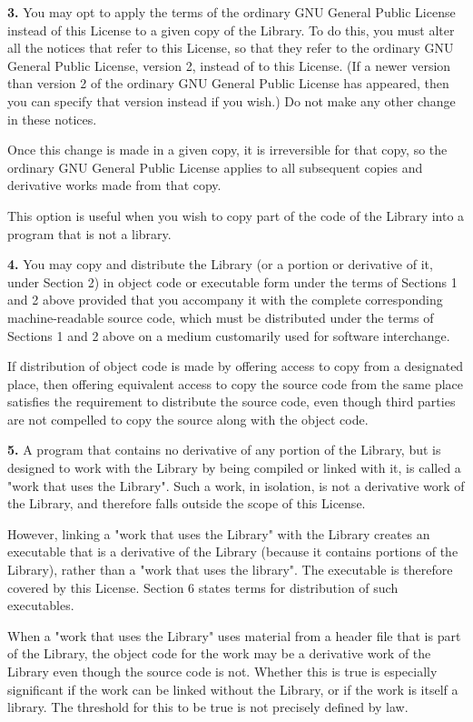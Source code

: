{\bf 3.} You may opt to apply the terms of the ordinary GNU General Public
License instead of this License to a given copy of the Library. To do this,
you must alter all the notices that refer to this License, so that they refer
to the ordinary GNU General Public License, version 2, instead of to this
License. (If a newer version than version 2 of the ordinary GNU General Public
License has appeared, then you can specify that version instead if you wish.)
Do not make any other change in these notices. 

Once this change is made in a given copy, it is irreversible for that copy, so
the ordinary GNU General Public License applies to all subsequent copies and
derivative works made from that copy. 

This option is useful when you wish to copy part of the code of the Library
into a program that is not a library. 

{\bf 4.} You may copy and distribute the Library (or a portion or derivative
of it, under Section 2) in object code or executable form under the terms of
Sections 1 and 2 above provided that you accompany it with the complete
corresponding machine-readable source code, which must be distributed under
the terms of Sections 1 and 2 above on a medium customarily used for software
interchange. 

If distribution of object code is made by offering access to copy from a
designated place, then offering equivalent access to copy the source code from
the same place satisfies the requirement to distribute the source code, even
though third parties are not compelled to copy the source along with the
object code. 

{\bf 5.} A program that contains no derivative of any portion of the Library,
but is designed to work with the Library by being compiled or linked with it,
is called a "work that uses the Library". Such a work, in isolation, is not
a derivative work of the Library, and therefore falls outside the scope of
this License. 

However, linking a "work that uses the Library" with the Library creates an
executable that is a derivative of the Library (because it contains portions
of the Library), rather than a "work that uses the library". The executable
is therefore covered by this License. Section 6 states terms for distribution
of such executables. 

When a "work that uses the Library" uses material from a header file that is
part of the Library, the object code for the work may be a derivative work of
the Library even though the source code is not. Whether this is true is
especially significant if the work can be linked without the Library, or if
the work is itself a library. The threshold for this to be true is not
precisely defined by law. 

